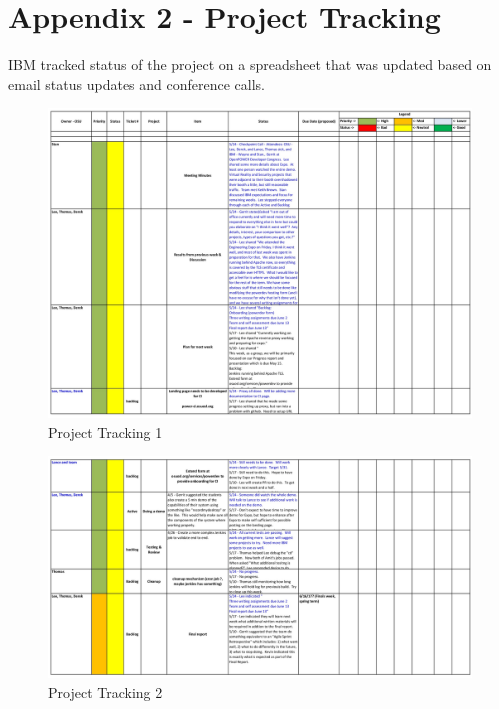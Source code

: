 \documentclass[10pt,letterpaper,onecolumn,draftclsnofoot]{IEEEtran}
\begin{document}
\section{Appendix 2 - Project Tracking} 
IBM tracked status of the project on a spreadsheet that was updated based on email status updates and conference calls.
\begin{figure}[H]
  \includegraphics[width=\textwidth]{images/1.eps}
  \caption{Project Tracking 1}
\end{figure}
\begin{figure}[H]
  \includegraphics[width=\textwidth]{images/2.eps}
  \caption{Project Tracking 2}
\end{figure}
\end{document}
